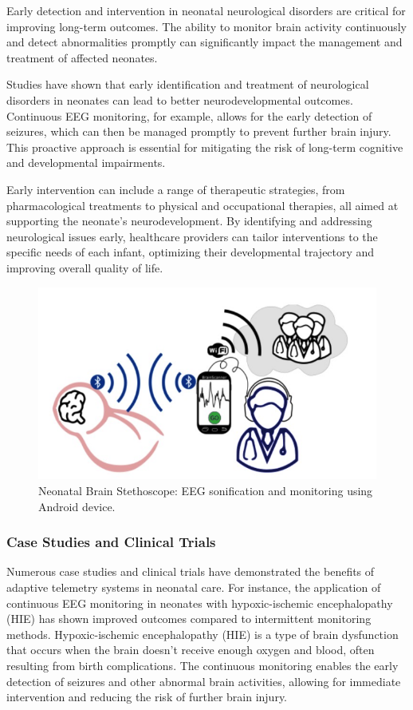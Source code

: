 \documentclass[12pt,journal,compsoc]{IEEEtran}
\begin{document}
Early detection and intervention in neonatal neurological disorders are critical for improving long-term outcomes. The ability to monitor brain activity continuously and detect abnormalities promptly can significantly impact the management and treatment of affected neonates.

Studies have shown that early identification and treatment of neurological disorders in neonates can lead to better neurodevelopmental outcomes. Continuous EEG monitoring, for example, allows for the early detection of seizures, which can then be managed promptly to prevent further brain injury. This proactive approach is essential for mitigating the risk of long-term cognitive and developmental impairments.

Early intervention can include a range of therapeutic strategies, from pharmacological treatments to physical and occupational therapies, all aimed at supporting the neonate's neurodevelopment. By identifying and addressing neurological issues early, healthcare providers can tailor interventions to the specific needs of each infant, optimizing their developmental trajectory and improving overall quality of life.

\begin{figure}[H]
    \centering
    \includegraphics[width=0.6\linewidth]{neonatal_brain_stethoscope.png}
    \caption{Neonatal Brain Stethoscope: EEG sonification and monitoring using Android device.}
    \label{fig:brain_stethoscope}
\end{figure}

\subsubsection{Case Studies and Clinical Trials}

Numerous case studies and clinical trials have demonstrated the benefits of adaptive telemetry systems in neonatal care. For instance, the application of continuous EEG monitoring in neonates with hypoxic-ischemic encephalopathy (HIE) has shown improved outcomes compared to intermittent monitoring methods. Hypoxic-ischemic encephalopathy (HIE) is a type of brain dysfunction that occurs when the brain doesn't receive enough oxygen and blood, often resulting from birth complications. The continuous monitoring enables the early detection of seizures and other abnormal brain activities, allowing for immediate intervention and reducing the risk of further brain injury.
\end{document}
